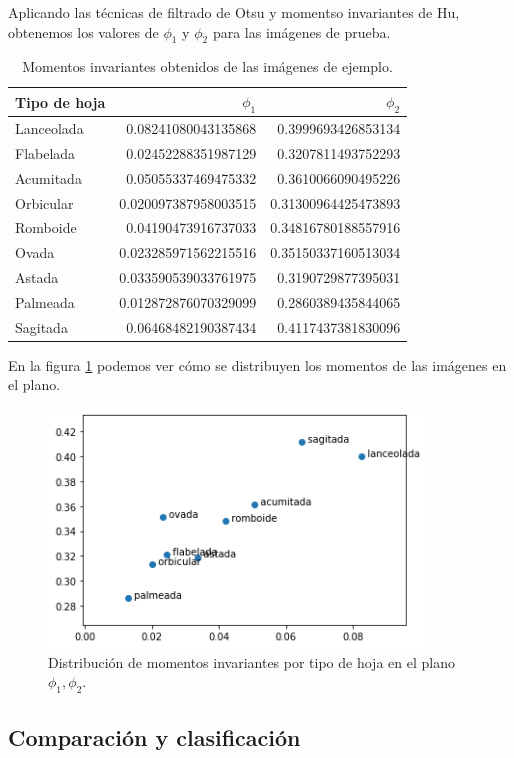 \documentclass[letter]{article}
\begin{document}
Aplicando las técnicas de filtrado de Otsu y momentso invariantes de Hu, obtenemos los valores de \(\phi_1\) y \(\phi_2\) para las imágenes de prueba.

\begin{table}[htbp]
\caption{Momentos invariantes obtenidos de las imágenes de ejemplo.}
\centering
\begin{tabular}{lrr}
\hline
Tipo de hoja & \(\phi_1\) & \(\phi_2\)\\
\hline
Lanceolada & 0.08241080043135868 & 0.3999693426853134\\
Flabelada & 0.02452288351987129 & 0.3207811493752293\\
Acumitada & 0.05055337469475332 & 0.3610066090495226\\
Orbicular & 0.020097387958003515 & 0.31300964425473893\\
Romboide & 0.04190473916737033 & 0.34816780188557916\\
Ovada & 0.023285971562215516 & 0.35150337160513034\\
Astada & 0.033590539033761975 & 0.3190729877395031\\
Palmeada & 0.012872876070329099 & 0.2860389435844065\\
Sagitada & 0.06468482190387434 & 0.4117437381830096\\
\hline
\end{tabular}
\end{table}

En la figura \ref{fig:org2d266b0} podemos ver cómo se distribuyen los momentos de las imágenes en el plano.

\begin{figure}[htbp]
\centering
\includegraphics[width=10cm]{./images/moments.jpg}
\caption{\label{fig:org2d266b0}Distribución de momentos invariantes por tipo de hoja en el plano \(\phi_1, \phi_2\).}
\end{figure}

\subsection{Comparación y clasificación}
\label{sec:org6e96d64}
\end{document}
